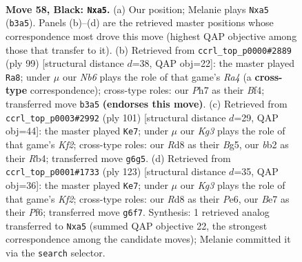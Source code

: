 \documentclass[11pt]{article}
\begin{document}
\clearpage

\begin{figure}[p]\centering
\begin{subfigure}{0.46\textwidth}\centering
\resizebox{\linewidth}{!}{%
\newchessgame
\chessboard[
  setfen={3r4/4b2p/p2p2k1/P3p2p/2P1P3/1n3P2/1B2K1BR/8 b - - 3 58},
  showmover=false,
  pgfstyle=straightmove, color=movearrow, markmove={b3-a5}
]}
\caption{}
\end{subfigure}\hfill
\begin{subfigure}{0.46\textwidth}\centering
\resizebox{\linewidth}{!}{%
\newchessgame
\chessboard[
  setfen={8/2pR2p1/1p5p/rP5P/p4b1k/P2B4/1PK5/8 b - - 22 50},
  showmover=false,
  pgfstyle=straightmove, color=movearrow, markmove={a5-a8}
]}
\caption{}
\end{subfigure}
\\[4pt]
\begin{subfigure}{0.46\textwidth}\centering
\resizebox{\linewidth}{!}{%
\newchessgame
\chessboard[
  setfen={8/5k2/R3p3/1pPpP1b1/1r1P1p1p/7P/2K2BP1/8 b - - 3 51},
  showmover=false,
  pgfstyle=straightmove, color=movearrow, markmove={f7-e7}
]}
\caption{}
\end{subfigure}\hfill
\begin{subfigure}{0.46\textwidth}\centering
\resizebox{\linewidth}{!}{%
\newchessgame
\chessboard[
  setfen={8/2b2k2/1p2pp2/6pp/r2P4/2P3PP/1R1B1P2/5K2 b - - 0 62},
  showmover=false,
  pgfstyle=straightmove, color=movearrow, markmove={f7-e7}
]}
\caption{}
\end{subfigure}
\caption{\textbf{Move 58, Black: \texttt{Nxa5}.} (a) Our position; Melanie plays \texttt{Nxa5} (\texttt{b3a5}). Panels (b)--(d) are the retrieved master positions whose correspondence most drove this move (highest QAP objective among those that transfer to it). (b) Retrieved from \texttt{ccrl\_top\_p0000\#2889} (ply 99) [structural distance $d$=38, QAP obj=22]: the master played \texttt{Ra8}; under $\mu$ our \emph{Nb6} plays the role of that game's \emph{Ra4} (a \textbf{cross-type} correspondence); cross-type roles: our \emph{P}h7 as their \emph{B}f4; transferred move \texttt{b3a5} \textbf{(endorses this move)}. (c) Retrieved from \texttt{ccrl\_top\_p0003\#2992} (ply 101) [structural distance $d$=29, QAP obj=44]: the master played \texttt{Ke7}; under $\mu$ our \emph{Kg3} plays the role of that game's \emph{Kf2}; cross-type roles: our \emph{R}d8 as their \emph{B}g5, our \emph{b}b2 as their \emph{R}b4; transferred move \texttt{g6g5}. (d) Retrieved from \texttt{ccrl\_top\_p0001\#1733} (ply 123) [structural distance $d$=35, QAP obj=36]: the master played \texttt{Ke7}; under $\mu$ our \emph{Kg3} plays the role of that game's \emph{Kf2}; cross-type roles: our \emph{R}d8 as their \emph{P}e6, our \emph{B}e7 as their \emph{P}f6; transferred move \texttt{g6f7}. Synthesis: 1 retrieved analog transferred to \texttt{Nxa5} (summed QAP objective 22, the strongest correspondence among the candidate moves); Melanie committed it via the \texttt{search} selector.}
\label{fig:thought-m115}
\end{figure}
\end{document}
